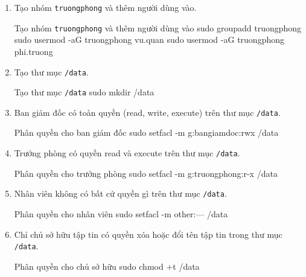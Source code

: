 \begin{enumerate}
  \item Tạo nhóm \texttt{truongphong} và thêm người dùng vào.\\
        \begin{bashlisting}[gobble=10]{Tạo nhóm \texttt{truongphong} và thêm người dùng vào}
          sudo groupadd truongphong
          sudo usermod -aG truongphong vu.quan
          sudo usermod -aG truongphong phi.truong
        \end{bashlisting}
  \item Tạo thư mục \texttt{/data}.\\
        \begin{bashlisting}[gobble=10]{Tạo thư mục \texttt{/data}}
          sudo mkdir /data
        \end{bashlisting}
  \item Ban giám đốc có toàn quyền (read, write, execute) trên thư mục \texttt{/data}.\\
        \begin{bashlisting}[gobble=10]{Phân quyền cho ban giám đốc}
          sudo setfacl -m g:bangiamdoc:rwx /data
        \end{bashlisting}
  \item Trưởng phòng có quyền read và execute trên thư mục \texttt{/data}.\\
        \begin{bashlisting}[gobble=10]{Phân quyền cho trưởng phòng}
          sudo setfacl -m g:truongphong:r-x /data
        \end{bashlisting}
  \item Nhân viên không có bất cứ quyền gì trên thư mục \texttt{/data}.\\
        \begin{bashlisting}[gobble=10]{Phân quyền cho nhân viên}
          sudo setfacl -m other:--- /data
        \end{bashlisting}
  \item Chỉ chủ sở hữu tập tin có quyền xóa hoặc đổi tên tập tin trong thư mục \texttt{/data}.
        \begin{bashlisting}[gobble=10]{Phân quyền cho chủ sở hữu}
          sudo chmod +t /data
        \end{bashlisting}
\end{enumerate}
